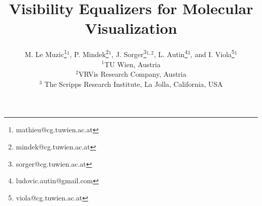 


\title[Visibility Equalizers]%
      {Visibility Equalizers for Molecular Visualization}

\author[M. Le Muzic et al.]
       {M. Le Muzic\thanks{mathieu@cg.tuwien.ac.at}$^{1}$,
        P. Mindek\thanks{mindek@cg.tuwien.ac.at}$^{1}$,
        J. Sorger\thanks{sorger@cg.tuwien.ac.at}$^{1,2}$,
        L. Autin\thanks{ludovic.autin@gmail.com}$^{3}$,
        and I. Viola\thanks{viola@cg.tuwien.ac.at}$^{1}$        
        \\
         $^1$TU Wien, Austria \\
         $^2$VRVis Research Company, Austria \\
        $^3$ The Scripps Research Institute, La Jolla, California, USA
       }


%





\maketitle

